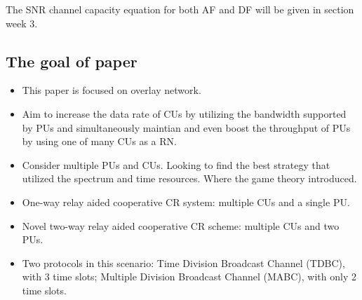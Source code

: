 \documentclass[journal]{IEEEtran}
\begin{document}
The SNR channel capacity equation for both AF and DF will be given in section week 3.

\subsection{The goal of paper \cite{liang2013cooperative}}
\begin{itemize}
  \item This paper is focused on overlay network.
  \item Aim to increase the data rate of CUs by utilizing the bandwidth supported by PUs and simultaneously maintian and even boost the throughput of PUs by using one of many CUs as a RN.
  \item Consider multiple PUs and CUs. Looking to find the best strategy that utilized the spectrum and time resources. Where the game theory introduced.
  \item One-way relay aided cooperative CR system: multiple CUs and a single PU.
  \item Novel two-way relay aided cooperative CR scheme: multiple CUs and two PUs.
  \item Two protocols in this scenario: Time Division Broadcast Channel (TDBC), with 3 time slots; Multiple Division Broadcast Channel (MABC), with only 2 time slots.
\end{itemize}
\end{document}
